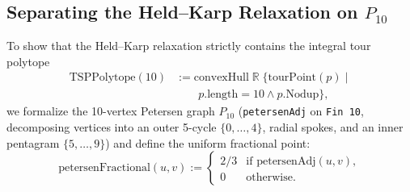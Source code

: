 \subsection{Separating the Held--Karp Relaxation on \texorpdfstring{$P_{10}$}{P10}}

To show that the Held--Karp relaxation strictly contains the integral tour polytope
\[
\begin{aligned}
  \mathrm{TSPPolytope}(10) &:= \mathrm{convexHull}\;\mathbb{R}\;\bigl\{\mathrm{tourPoint}(p) \;\big|\; \\
  &\qquad p.\mathrm{length} = 10 \land p.\mathrm{Nodup}\bigr\},
\end{aligned}
\]
we formalize the 10-vertex Petersen graph $P_{10}$ (\texttt{petersenAdj} on \texttt{Fin 10}, decomposing vertices into an outer 5-cycle $\{0,\dots,4\}$, radial spokes, and an inner pentagram $\{5,\dots,9\}$) and define the uniform fractional point:
\begin{equation}
  \mathrm{petersenFractional}(u, v) := \begin{cases} 2/3 & \text{if } \mathrm{petersenAdj}(u, v), \\ 0 & \text{otherwise.} \end{cases}
\end{equation}

